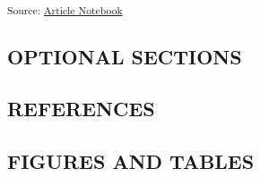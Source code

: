 \documentclass[
]{agujournal2019}
\begin{document}
\textsubscript{Source:
\href{https://rvcrawford.github.io/glowing-system/index.qmd.html}{Article
Notebook}}

\subsection{OPTIONAL SECTIONS}\label{optional-sections}

\subsection{REFERENCES}\label{references}

\subsection*{FIGURES AND TABLES}\label{figures-and-tables}
\end{document}
